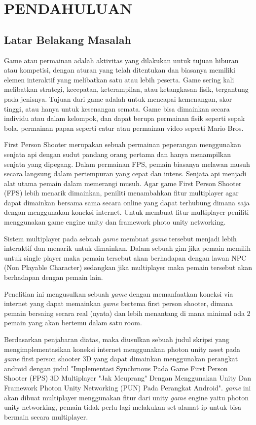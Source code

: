\chapter{PENDAHULUAN}
\section{Latar Belakang Masalah}
 
Game atau permainan adalah aktivitas yang dilakukan untuk tujuan hiburan atau kompetisi, dengan aturan yang telah ditentukan dan biasanya memiliki elemen interaktif yang melibatkan satu atau lebih peserta. Game sering kali melibatkan strategi, kecepatan, keterampilan, atau ketangkasan fisik, tergantung pada jenisnya. Tujuan dari game adalah untuk mencapai kemenangan, skor tinggi, atau hanya untuk kesenangan semata. Game bisa dimainkan secara individu atau dalam kelompok, dan dapat berupa permainan fisik seperti sepak bola, permainan papan seperti catur atau permainan video seperti Mario Bros.

First Person Shooter merupakan sebuah permainan peperangan menggunakan senjata api dengan sudut pandang orang pertama dan hanya menampilkan senjata yang dipegang.
Dalam permainan FPS, pemain biasanya melawan musuh secara langsung dalam pertempuran yang cepat dan intens. Senjata api menjadi alat utama pemain dalam memerangi musuh.
Agar game First Person Shooter (FPS) lebih menarik dimainkan, peniliti menambahkan fitur multiplayer agar dapat dimainkan bersama sama secara online yang dapat terhubung dimana saja dengan menggunakan koneksi internet. Untuk membuat fitur multiplayer peniliti menggunakan game engine unity dan framework photo unity networking.

Sistem multiplayer pada sebuah \textit{game} membuat \textit{game} tersebut menjadi lebih interaktif dan menarik untuk dimainkan. Dalam sebuah gim jika pemain memilih untuk single player maka pemain tersebut akan berhadapan dengan lawan NPC (Non Playable Character) sedangkan jika multiplayer maka pemain tersebut akan berhadapan dengan pemain lain.


Penelitian ini mengusulkan sebuah \textit{game} dengan memanfaatkan koneksi via internet yang dapat memainkan \textit{game} bertema first person shooter, dimana pemain bersaing secara real (nyata) dan lebih menantang di mana minimal ada 2 pemain yang akan bertemu dalam satu room.

Berdasarkan penjabaran diatas, maka diusulkan sebuah judul skripsi yang mengimplementasikan koneksi internet menggunakan photon unity asset pada \textit{game} first person shooter 3D yang dapat dimainkan menggunakan perangkat android dengan judul "Implementasi Synchrnous Pada Game First Person Shooter (FPS) 3D Multiplayer "Jak Meuprang" Dengan Menggunakan Unity Dan Framework Photon Unity Networking (PUN) Pada Perangkat Android".
\textit{game} ini akan dibuat multiplayer menggunakan fitur dari unity \textit{game} engine yaitu photon unity networking, pemain tidak perlu lagi melakukan set alamat ip untuk bisa bermain secara multiplayer.

